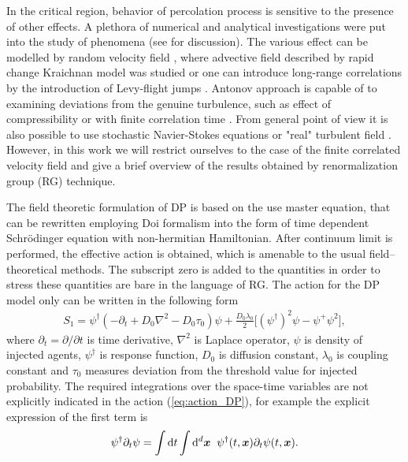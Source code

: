 In the critical region, behavior of percolation process is sensitive to the presence of
 other effects. A plethora of numerical and analytical investigations were put into the study of 
  phenomena (see \cite{ Jansen_Tauber_2004} for discussion).
   The various effect can be modelled by random velocity field 
   \cite{Antonov_1999}, where advective field described by rapid change
    Kraichnan model was studied or one can introduce long-range correlations by
    the introduction of Levy-flight jumps \cite{Jan99_Hin07_Jan08}.
  Antonov approach is capable of to examining deviations from the genuine turbulence, such as
     effect of compressibility \cite{Antonov_Kapusin_2008,Antonov_Kapusin_2010} or 
      with finite correlation time \cite{DP13}. From general point of view
      it is also possible to use stochastic Navier-Stokes 
      equations or "real" turbulent field 
\cite{Ant11,Vasiliev}. However, in this work we will restrict ourselves to the case of the finite 
correlated velocity field \cite{Antonov_1999} and give a brief overview of the results
obtained by renormalization group (RG) technique.

The field theoretic formulation of DP is based on the use master equation, that can be rewritten employing Doi formalism \cite{Doi} into the form of time dependent Schr\"{o}dinger equation with non-hermitian Hamiltonian. After  continuum limit is performed, the effective action is obtained, which is amenable to the usual field--theoretical methods.
The subscript zero is added to the quantities in order to stress these quantities are bare in the language of
RG. The action for the DP model only \cite{Jansen_Tauber_2004} can be written in the following form
\begin{eqnarray}
S_{1} = \psi^{\dagger}(-\partial_t + D_0 \nabla^2 - D_0 \tau_0) \psi 
+\frac{D_0 \lambda_0}{2} \Big[ (\psi^{\dagger})^2 \psi - \psi^+ \psi^2 \Big],
\label{eq:action_DP}
\end{eqnarray}
where $\partial_t = \partial / \partial t$ is time derivative, $\nabla^2$ is Laplace operator, $\psi$ is density of injected agents, $\psi^{\dagger}$ is response function, $D_0$ is diffusion constant, $\lambda_0$ is coupling constant and $\tau_0$ measures deviation from the threshold value for injected probability. The required integrations over the space-time  variables are not explicitly indicated in the action (\ref{eq:action_DP}), for example the explicit expression
of the first term is
\begin{equation}
\psi^{\dagger} \partial_t \psi  = \int {\mathrm d}t \int {\mathrm d}^d{\bm x} \hspace{2mm}
 \psi^\dagger(t,{\bm x}) \partial_t \psi(t, {\bm x}).
\end{equation}

